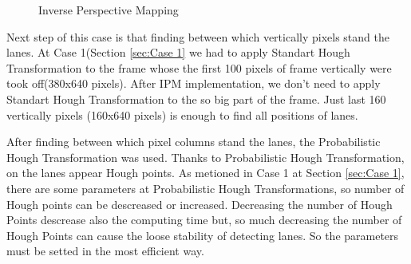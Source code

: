  
\begin{figure}[H]
  \centering
  \hfill
  \caption{Inverse Perspective Mapping}
\end{figure} 

Next step of this case is that finding between which vertically pixels stand the lanes. At Case 1(Section \ref{sec:Case 1} we had to apply Standart Hough Transformation to the frame whose the first 100 pixels of frame vertically were took off(380x640 pixels). After IPM implementation, we don't need to apply Standart Hough Transformation to the so big part of the frame. Just last 160 vertically pixels (160x640 pixels) is enough to find all positions of lanes.

After finding between which pixel columns stand the lanes, the Probabilistic Hough Transformation was used. Thanks to Probabilistic Hough Transformation, on the lanes appear Hough points. As metioned in Case 1 at Section \ref{sec:Case 1}, there are some parameters at Probabilistic Hough Transformations, so number of Hough points can be descreased or increased. Decreasing the number of Hough Points descrease also the computing time but, so much decreasing the number of Hough Points can cause the loose stability of detecting lanes. So the parameters must be setted in the most efficient way.

